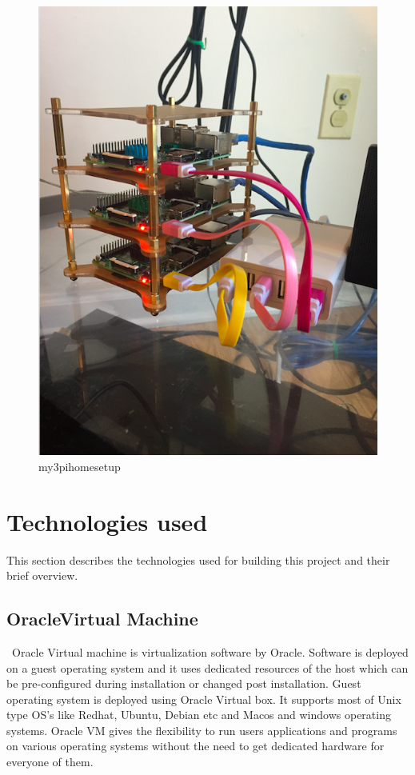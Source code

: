 \begin{figure}[!ht]
  \centering\includegraphics[width=\columnwidth]{images/hid-sp18-413-my3pi.png}
  \caption{my3pihomesetup}\label{F:setup}
\end{figure}

\section{Technologies used}
This section describes the technologies used for building this project
and their brief overview. 

\subsection{OracleVirtual Machine}
~\cite{hid-sp18-413-OracleVM}Oracle Virtual machine is virtualization software by Oracle. Software
is deployed on a guest operating system and it uses dedicated
resources of the host which can be pre-configured during installation
or changed post installation. Guest operating system is deployed using
Oracle Virtual box. It supports most of Unix type OS's like Redhat,
Ubuntu, Debian etc and Macos and windows operating systems. Oracle VM
gives the flexibility to run users applications and programs on
various operating systems without the need to get dedicated hardware
for everyone of them.

